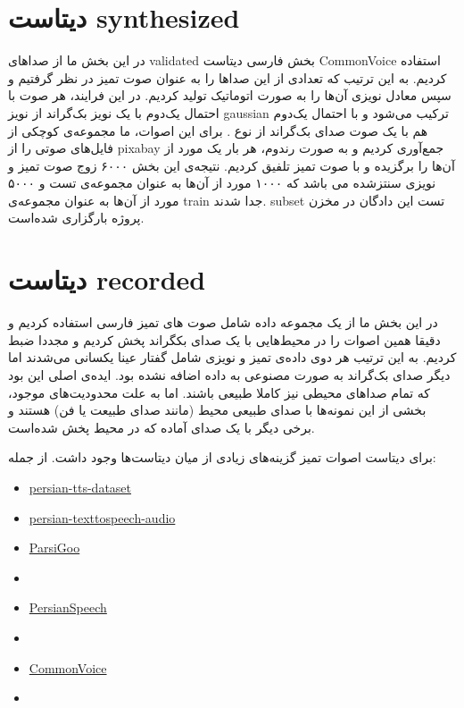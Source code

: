 \documentclass[fleqn]{report}
\begin{document}
\section{دیتاست synthesized}
در این بخش ما از صداهای validated بخش فارسی دیتاست CommonVoice استفاده کردیم.
به این ترتیب که تعدادی از این صداها را به عنوان صوت تمیز در نظر گرفتیم و سپس معادل نویزی آن‌ها را به صورت اتوماتیک تولید کردیم.
در این فرایند، هر صوت با احتمال یک‌دوم با یک نویز بک‌گراند از نویز gaussian ترکیب می‌شود و با 
احتمال یک‌دوم هم با یک صوت صدای بک‌گراند از نوع .
برای این اصوات، ما مجموعه‌ی کوچکی از فایل‌های صوتی  را از pixabay جمع‌آوری کردیم و به صورت رندوم، هر بار یک مورد از آن‌ها را برگزیده و با صوت تمیز تلفیق کردیم.
نتیجه‌ی این بخش ۶۰۰۰ زوج صوت تمیز و نویزی سنتزشده می باشد که ۱۰۰۰ مورد از آن‌ها به عنوان مجموعه‌ی تست و ۵۰۰۰ مورد از آن‌ها به عنوان مجموعه‌ی train جدا شدند.
subset تست این دادگان در مخزن پروژه بارگزاری شده‌است.

\section{دیتاست recorded}  
در این بخش ما
 از یک مجموعه داده شامل صوت های تمیز فارسی استفاده کردیم 
و دقیقا همین اصوات را در محیط‌هایی با یک صدای بکگراند پخش کردیم و مجددا ضبط کردیم.
به این ترتیب هر دوی داده‌ی تمیز و نویزی شامل گفتار عینا یکسانی می‌شدند اما دیگر صدای بک‌گراند به صورت مصنوعی به داده اضافه نشده بود.
ایده‌ی اصلی این بود که تمام صدا‌های محیطی نیز کاملا طبیعی باشند. اما به علت محدودیت‌های موجود، بخشی از این نمونه‌ها با صدای طبیعی محیط (مانند صدای طبیعت یا فن) هستند و برخی دیگر با یک صدای آماده که در محیط پخش شده‌است.

برای دیتاست اصوات تمیز گزینه‌های زیادی از میان دیتاست‌ها وجود داشت. از جمله:

\begin{itemize}
    \item \href{https://www.kaggle.com/datasets/magnoliasis/persian-tts-dataset}{persian-tts-dataset}
    \item \href{https://www.kaggle.com/datasets/moradi/persian-texttospeech-audio}{persian-texttospeech-audio}
    \item \href{https://huggingface.co/datasets/Kamtera/ParsiGoo}{ParsiGoo}
    \item \href{https://fa.persianspeechcorpus.com/}{}
    \item \href{https://github.com/persiandataset/PersianSpeech}{PersianSpeech}
    \item \href{https://www.kaggle.com/datasets/amirpourmand/automatic-speech-recognition-farsi-youtube}{}
    \item \href{https://commonvoice.mozilla.org/en/datasets}{CommonVoice}
    \item \href{https://github.com/shenasa-ai/speech2text}{}
\end{itemize}
\end{document}
